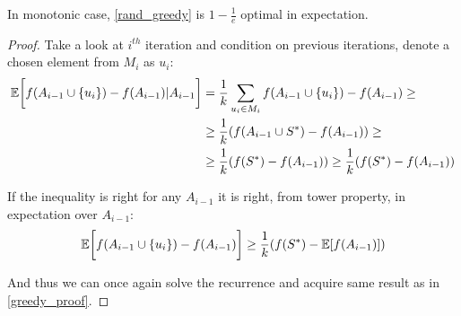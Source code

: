 \begin{theorem}
	In monotonic case, \cref{rand_greedy} is $1-\frac{1}{e}$ optimal in expectation.
	\begin{proof}
		Take a look at $i^{th}$ iteration and condition on previous iterations, denote a chosen element from $M_i$ as $u_i$:
		\begin{align}
		\mathbb{E} \qty\bigg[f(A_{i-1} \cup \qty{u_i}) - f(A_{i-1}) | A_{i-1} ] &= \frac{1}{k} \sum_{u_i \in M_i} f(A_{i-1} \cup \qty{u_i}) - f(A_{i-1}) \geq\\&\geq \frac{1}{k} \qty( f(A_{i-1} \cup S^*) - f(A_{i-1}) ) \geq\\&\geq \frac{1}{k} \qty( f(S^*) - f(A_{i-1}))\geq \frac{1}{k} \qty( f(S^*) - f(A_{i-1}))
		\end{align}
		
		If the inequality is right for any $A_{i-1}$ it is right, from tower property, in expectation over $A_{i-1}$:
		\begin{align}
		\mathbb{E} \qty\bigg[f(A_{i-1} \cup \qty{u_i}) - f(A_{i-1}) ] \geq 	\frac{1}{k} \qty( f(S^*) - \mathbb{E} \qty[ f(A_{i-1})] )
		\end{align}
		
		And thus we can once again solve the recurrence and acquire same result as in \vref{greedy_proof}.
	\end{proof}
\end{theorem}
